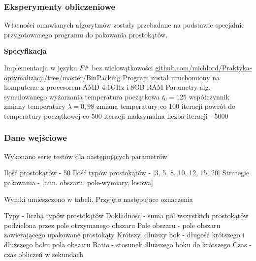 \documentclass{beamer}
\newcommand{\Fsharp}{%
    {\settoheight{\dimen0}{F}F\kern-.05em \resizebox{!}{\dimen0}{\raisebox{\depth}{\#}}}}
\begin{document}
\begin{frame}
    \frametitle{Eksperymenty obliczeniowe}
    Własności omawianych algorytmów zostały przebadane na podstawie specjalnie przygotowanego
    programu do pakowania prostokątów. \newline
    
    
    \textbf{Specyfikacja}
    \begin{outline}
        \1 Implementacja w języku $\Fsharp$ bez wielowątkowości \newline
         \href{https://github.com/michlord/Praktyka-optymalizacji/tree/master/BinPacking}
         {github.com/michlord/Praktyka-optymalizacji/tree/master/BinPacking} 
        \1 Program został uruchomiony na komputerze z procesorem
         AMD 4.1GHz i 8GB RAM
        \1 Parametry alg. symulowanego wyżarzania
        \2 temperatura początkowa $t_0=125$
        \2 współczynnik zmiany temperatury $\lambda=0,98$
        \2 zmiana temperatury co 100 iteracji
        \2 powrót do temperatury początkowej co 500 iteracji
        \2 maksymalna liczba iteracji - 5000
        
    \end{outline}
    
\end{frame}

\begin{frame}
    \frametitle{Dane wejściowe}
    Wykonano serię testów dla następujących parametrów
    \begin{outline}
        \1 Ilość prostokątów - 50
        \1 Ilość typów prostokątów - [3, 5, 8, 10, 12, 15, 20]
        \1 Strategie pakowania - [min. obszaru, pole-wymiary, losowa]
    \end{outline}
    
    Wyniki umieszczono w tabeli. Przyjęto następujące oznaczenia
    \begin{outline}
        \1 Typy - liczba typów prostokątów
        \1 Dokładność - suma pól wszystkich prostokątów podzielona przez pole otrzymanego obszaru
        \1 Pole obszaru - pole obszaru zawierającego upakowane prostokąty
        \1 Krótszy, dłuższy bok - długość krótszego i dłuższego boku pola obszaru
        \1 Ratio - stosunek dłuższego boku do krótszego
        \1 Czas - czas obliczeń w sekundach
    \end{outline}
\end{frame}
\end{document}
